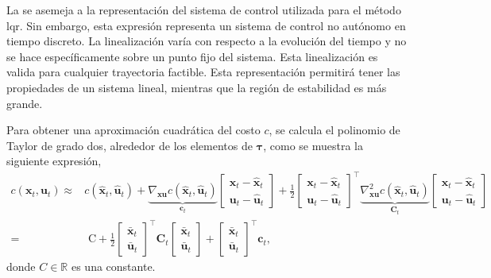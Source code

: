 La  se asemeja a la representación del sistema de control utilizada para el método \acrshort{lqr}. Sin embargo, esta expresión representa un sistema de control no autónomo en tiempo discreto. La linealización varía con respecto a la evolución del tiempo y no se hace específicamente sobre un punto fijo del sistema. Esta linealización es valida para cualquier trayectoria factible. Esta representación permitirá tener las propiedades de un sistema lineal, mientras que la región de estabilidad es más grande. \cite{underactuated} 

Para obtener una aproximación cuadrática del costo $c$, se calcula el polinomio de Taylor de grado dos, alrededor de los elementos de $\bm\tau$, como se muestra la siguiente expresión,
\begin{equation}
\begin{aligned}
    c(\mathbf{x}_t, \mathbf{u}_t) \approx& 
    c\left(\hat{\mathbf{x}}_t, \hat{\mathbf{u}}_t\right) 
    + 
\underbrace{\nabla_{\mathbf{x}\mathbf{u}}
    c\left(\hat{\mathbf{x}}_t, \hat{\mathbf{u}}_t\right)}_{\mathbf{c}_t}
    \begin{bmatrix}
        \mathbf{x}_t - \hat{\mathbf{x}}_t \\
        \mathbf{u}_t - \hat{\mathbf{u}}_t
    \end{bmatrix}
    + \frac{1}{2}
    \begin{bmatrix}
        \mathbf{x}_t - \hat{\mathbf{x}}_t \\
        \mathbf{u}_t - \hat{\mathbf{u}}_t
    \end{bmatrix}^{\top}
    \underbrace{\nabla_{\mathbf{x}\mathbf{u}}^{2} 
    c\left(\hat{\mathbf{x}}_t, \hat{\mathbf{u}}_t\right)}_{\mathbf{C}_t}
    \begin{bmatrix}
        \mathbf{x}_t - \hat{\mathbf{x}}_t \\
        \mathbf{u}_t - \hat{\mathbf{u}}_t
    \end{bmatrix} \\
=& \text{ C} + \frac{1}{2} 
\begin{bmatrix}
        \bar{\mathbf{x}}_t \\
        \bar{\mathbf{u}}_t
    \end{bmatrix}^{\top}
    \mathbf{C}_t 
    \begin{bmatrix}
        \bar{\mathbf{x}}_t \\
        \bar{\mathbf{u}}_t
    \end{bmatrix}
    + 
    \begin{bmatrix}
        \bar{\mathbf{x}}_t \\
        \bar{\mathbf{u}}_t
    \end{bmatrix}^{\top}
    \mathbf{c}_t ,
\end{aligned}
    \label{eq:taylor_cost}
\end{equation}
donde $C\in\mathbb{R}$ es una constante.

